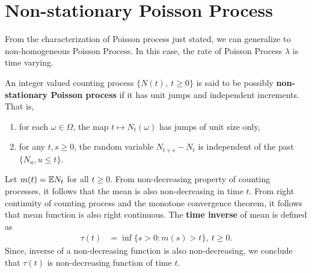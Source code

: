 \documentclass[a4paper,english,10pt]{article}
\begin{document}
\section{Non-stationary Poisson Process}
From the characterization of Poisson process just stated, we can generalize to non-homogeneous Poisson Process. 
In this case, the rate of Poisson Process $\lambda$ is time varying. 

An integer valued counting process $\{N(t),~t\geqslant 0\}$ is said to be possibly \textbf{non-stationary Poisson process} if it has unit jumps and independent increments. 
That is,
\begin{enumerate} 
\item for each $\omega \in \Omega$, the map $t \mapsto N_t(\omega)$ has jumps of unit size only,
\item for any $t,s \geq 0$, the random variable $N_{t+s} - N_t$ is independent of the past $\{N_u, u \leqslant t\}$. 
\end{enumerate}
	
Let $m(t) = \mathbb{E} N_t$ for all $t \geqslant 0$. 
From non-decreasing property of counting processes, it follows that the mean is also non-decreasing in time $t$. 
From right continuity of counting process and the monotone convergence theorem, it follows that mean function is also right continuous. 
The \textbf{time inverse} of mean is defined as
\begin{align*}
\tau(t) &= \inf\{ s > 0 : m(s) > t\},~ t \geqslant 0. 
\end{align*}
Since, inverse of a non-decreasing function is also non-decreasing, we conclude that $\tau(t)$ is non-decreasing function of time $t$. 
\end{document}
